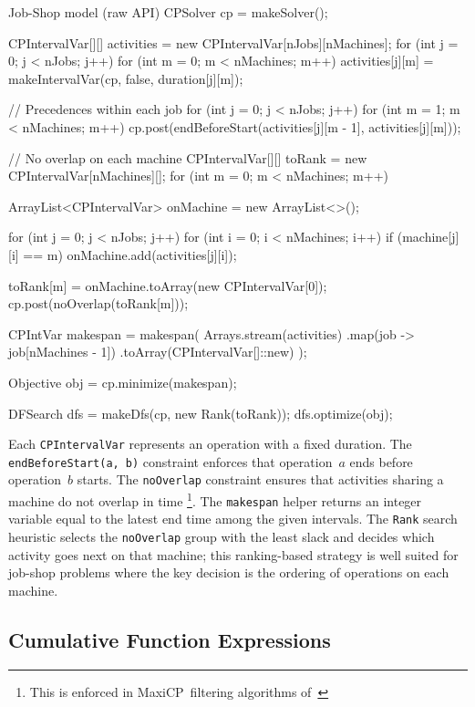 \documentclass[11pt, a4paper]{scrartcl}
\newcommand{\maxicp}{\textsf{MaxiCP}}
\begin{document}
\begin{codebox}[label={lst:jobshop}]{Job-Shop model (raw API)}
CPSolver cp = makeSolver();

CPIntervalVar[][] activities = new CPIntervalVar[nJobs][nMachines];
for (int j = 0; j < nJobs; j++) {
    for (int m = 0; m < nMachines; m++) {
        activities[j][m] = makeIntervalVar(cp, false, duration[j][m]);
    }
}

// Precedences within each job
for (int j = 0; j < nJobs; j++) {
    for (int m = 1; m < nMachines; m++) {
        cp.post(endBeforeStart(activities[j][m - 1], activities[j][m]));
    }
}

// No overlap on each machine
CPIntervalVar[][] toRank = new CPIntervalVar[nMachines][];
for (int m = 0; m < nMachines; m++) {
    ArrayList<CPIntervalVar> onMachine = new ArrayList<>();

    for (int j = 0; j < nJobs; j++) {
        for (int i = 0; i < nMachines; i++) {
            if (machine[j][i] == m) {
                onMachine.add(activities[j][i]);
            }
        }
    }

    toRank[m] = onMachine.toArray(new CPIntervalVar[0]);
    cp.post(noOverlap(toRank[m]));
}

CPIntVar makespan = makespan(
  Arrays.stream(activities)
        .map(job -> job[nMachines - 1])
        .toArray(CPIntervalVar[]::new)
);

Objective obj = cp.minimize(makespan);

DFSearch dfs = makeDfs(cp, new Rank(toRank));
dfs.optimize(obj);
\end{codebox}

Each \texttt{CPIntervalVar} represents an operation with a fixed duration. 
The \texttt{endBeforeStart(a, b)} constraint enforces that operation~$a$ ends before operation~$b$ starts. 
The \texttt{noOverlap} constraint ensures that activities sharing a machine do not overlap in time \footnote{This is enforced in \maxicp\  filtering algorithms of~\cite{vilim2007global}}.
The \texttt{makespan} helper returns an integer variable equal to the latest end time among the given intervals. The \texttt{Rank} search heuristic selects the \texttt{noOverlap} group with the least slack and decides which activity goes next on that machine; this ranking-based strategy is well suited for job-shop problems where the key decision is the ordering of operations on each machine.


\subsection{Cumulative Function Expressions}
\end{document}
